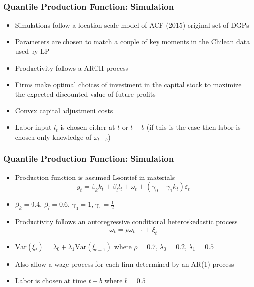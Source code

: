 \documentclass{beamer}
\begin{document}

\begin{frame}
\frametitle{Quantile Production Function: Simulation}
\begin{itemize}
	\item Simulations follow a location-scale model of ACF (2015) original set of DGPs 
	\item Parameters are chosen to match a couple of key moments in the Chilean data used by LP
	\item Productivity follows a ARCH process
	\item Firms make optimal choices of investment in the capital stock to maximize the expected discounted value of future profits
	\item Convex capital adjustment costs
	\item Labor input $l_{t}$ is chosen either at $t$ or $t-b$ (if this is the case then labor is chosen only knowledge of $\omega_{t-b}$)
\end{itemize}
\end{frame}


\begin{frame}
\frametitle{Quantile Production Function: Simulation}
\begin{itemize}
	\item Production function is assumed Leontief in materials
	\begin{equation}
		y_{t}=\beta_{k}k_{t}+\beta_{l}l_{t}+\omega_{t}+(\gamma_{0}+\gamma_{1}k_{t})\varepsilon_{t}
	\end{equation}
	\item $\beta_{k}=0.4$, $\beta_{l}=0.6$, $\gamma_{0}=1$, $\gamma_{1}=\frac{1}{2}$
	\item Productivity follows an autoregressive conditional heteroskedastic process
	\begin{equation}
		\omega_{t}=\rho\omega_{t-1}+\xi_{t}
	\end{equation}
	\item $\text{Var}(\xi_{t})=\lambda_{0}+\lambda_{1}\text{Var}(\xi_{t-1})$
	where $\rho=0.7$, $\lambda_{0}=0.2$, $\lambda_{1}=0.5$
	\item Also allow a wage process for each firm determined by an AR(1) process
	\item Labor is chosen at time $t-b$ where $b=0.5$
\end{itemize}
\end{frame}
\end{document}
